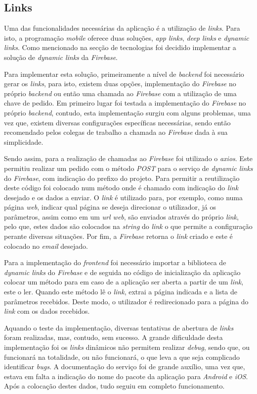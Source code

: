 \subsection{Links}
Uma das funcionalidades necessárias da aplicação é a utilização de \textit{links}. Para isto, a programação \textit{mobile} oferece duas soluções, \textit{app links}, \textit{deep links} e \textit{dynamic links}. Como mencionado na secção de tecnologias foi decidido implementar a solução de \textit{dynamic links} da \textit{Firebase}.

Para implementar esta solução, primeiramente a nível de \textit{backend} foi necessário gerar os \textit{links}, para isto, existem duas opções, implementação do \textit{Firebase} no próprio \textit{backend} ou então uma chamada ao \textit{Firebase} com a utilização de uma chave de pedido. Em primeiro lugar foi testada a implementação do \textit{Firebase} no próprio \textit{backend}, contudo, esta implementação surgiu com alguns problemas, uma vez que, existem diversas configurações específicas necessárias, sendo então recomendado pelos colegas de trabalho a chamada ao \textit{Firebase} dada à sua simplicidade.

Sendo assim, para a realização de chamadas ao \textit{Firebase} foi utilizado o \textit{axios}. Este permitiu realizar um pedido com o método \textit{POST} para o serviço de \textit{dynamic links} do \textit{Firebase}, com indicação do prefixo do projeto. Para permitir a reutilização deste código foi colocado num método onde é chamado com indicação do \textit{link} desejado e os dados a enviar. O \textit{link} é utilizado para, por exemplo, como numa página \textit{web}, indicar qual página se deseja direcionar o utilizador, já os parâmetros, assim como em um \textit{url web}, são enviados através do próprio \textit{link}, pelo que, estes dados são colocados na \textit{string} do \textit{link} o que permite a configuração perante diversas situações. Por fim, a \textit{Firebase} retorna o \textit{link} criado e este é colocado no \textit{email} desejado.

Para a implementação do \textit{frontend} foi necessário importar a biblioteca de \textit{dynamic links} do \textit{Firebase} e de seguida no código de inicialização da aplicação colocar um método para em caso de a aplicação ser aberta a partir de um \textit{link}, este o ler. Quando este método lê o \textit{link}, extrai a página indicada e a lista de parâmetros recebidos. Deste modo, o utilizador é redirecionado para a página do \textit{link} com os dados recebidos.

Aquando o teste da implementação, diversas tentativas de abertura de \textit{links} foram realizadas, mas, contudo, sem sucesso. A grande dificuldade desta implementação foi os \textit{links} dinâmicos não permitem realizar \textit{debug}, sendo que, ou funcionará na totalidade, ou não funcionará, o que leva a que seja complicado identificar \textit{bugs}. A documentação do serviço foi de grande auxílio, uma vez que, estava em falta a indicação do nome do pacote da aplicação para \textit{Android} e \textit{iOS}. Após a colocação destes dados, tudo seguiu em completo funcionamento.